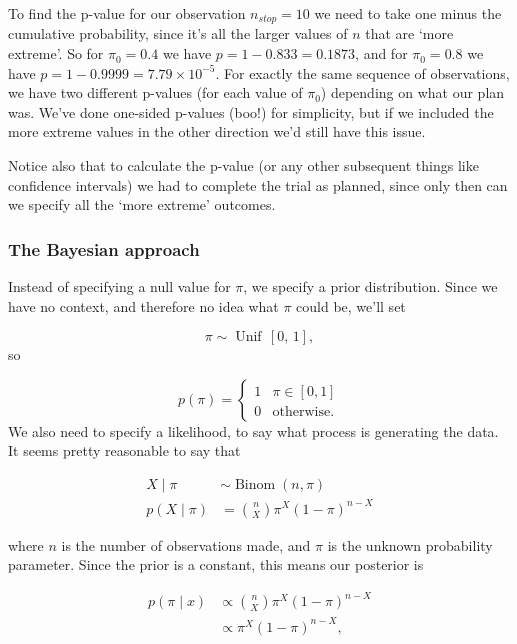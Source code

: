 \documentclass[
  openany]{book}
\theoremstyle{definition}
\theoremstyle{definition}
\theoremstyle{definition}
\theoremstyle{definition}
\theoremstyle{remark}
\begin{document}
To find the p-value for our observation \(n_{stop}=10\) we need to take one minus the cumulative probability, since it's all the larger values of \(n\) that are `more extreme'. So for \(\pi_0=0.4\) we have \(p=1-0.833 = 0.1873\), and for \(\pi_0=0.8\) we have \(p=1-0.9999 = 7.79\times{10^{-5}}\). For exactly the same sequence of observations, we have two different p-values (for each value of \(\pi_0\)) depending on what our plan was. We've done one-sided p-values (boo!) for simplicity, but if we included the more extreme values in the other direction we'd still have this issue.

Notice also that to calculate the p-value (or any other subsequent things like confidence intervals) we had to complete the trial as planned, since only then can we specify all the `more extreme' outcomes.

\hypertarget{the-bayesian-approach-2}{%
\subsubsection{The Bayesian approach}\label{the-bayesian-approach-2}}

Instead of specifying a null value for \(\pi\), we specify a prior distribution. Since we have no context, and therefore no idea what \(\pi\) could be, we'll set

\[\pi \sim \operatorname{Unif}\,\left[0,\,1\right], \]
so

\[ 
p\left(\pi\right) = 
\begin{cases}
1 & \pi \in \left[0,1\right]\\
0 & \text{otherwise.}
\end{cases}
\]
We also need to specify a likelihood, to say what process is generating the data. It seems pretty reasonable to say that

\begin{align*}
X\mid\pi & \sim \operatorname{Binom}\left(n,\pi\right)\\
p\left(X\mid{\pi}\right) & = \binom{n}{X} \pi^X \left(1-\pi\right)^{n-X}
\end{align*}

where \(n\) is the number of observations made, and \(\pi\) is the unknown probability parameter. Since the prior is a constant, this means our posterior is

\begin{align*}
p\left(\pi\mid x\right) & \propto \binom{n}{X} \pi^X \left(1-\pi\right)^{n-X}\\
&\propto \pi^X \left(1-\pi\right)^{n-X},
\end{align*}
\end{document}
